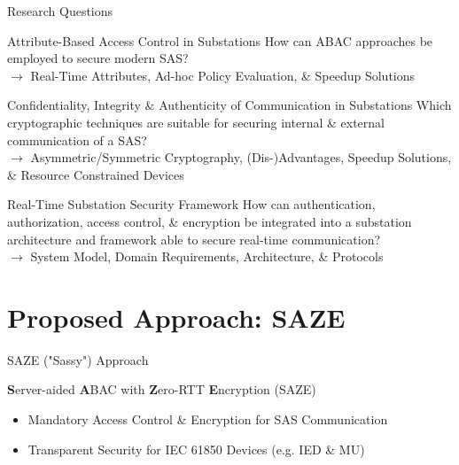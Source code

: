 \documentclass[en]{sdqbeamer}
\begin{document}
\begin{frame}{Research Questions}
    \begin{greenblock}{Attribute-Based Access Control in Substations}
        How can ABAC approaches be employed to secure modern SAS?
        \\$\rightarrow$ Real-Time Attributes, Ad-hoc Policy Evaluation, \& Speedup Solutions
    \end{greenblock}

    \begin{greenblock}{Confidentiality, Integrity \& Authenticity of Communication in Substations}
        Which cryptographic techniques are suitable for securing internal \& external communication of a SAS?
        \\$\rightarrow$ Asymmetric/Symmetric Cryptography, (Dis-)Advantages, Speedup Solutions, \& Resource Constrained Devices
    \end{greenblock}

    \begin{greenblock}{Real-Time Substation Security Framework}
        How can authentication, authorization, access control, \& encryption be integrated into a substation architecture and framework able to secure real-time communication?
        \\$\rightarrow$ System Model, Domain Requirements, Architecture, \& Protocols
    \end{greenblock}
\end{frame}

\section{Proposed Approach: SAZE}
\begin{frame}{SAZE ("Sassy") Approach}
    \begin{greenblock}{\textbf{S}erver-aided \textbf{A}BAC with \textbf{Z}ero-RTT \textbf{E}ncryption (SAZE)}
        \begin{itemize}
            \item Mandatory Access Control \& Encryption for SAS Communication
            \item Transparent Security for IEC 61850 Devices (e.g. IED \& MU)
        \end{itemize}
    \end{greenblock}
\end{frame}
\end{document}
